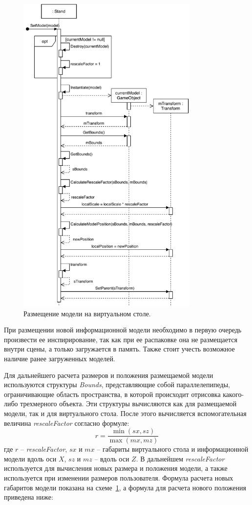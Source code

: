 \begin{figure}[!htp]
    \centering
    \includegraphics[width=0.8\textwidth]{images/UML-SPlaceModel.pdf}
    \caption{Размещение модели на виртуальном столе.}
    \label{figure:SPlaceModel}
\end{figure}

При размещении новой информационной модели необходимо в первую очередь
произвести ее инспирирование, так как при ее распаковке она не размещается
внутри сцены, а только загружается в память.
Также стоит учесть возможное наличие ранее загруженных моделей.

Для дальнейшего расчета размеров и положения размещаемой модели используются
структуры \emph{Bounds}, представляющие собой параллелепипеды,
ограничивающие область пространства, в которой происходит отрисовка
какого-либо трехмерного объекта. Эти структуры вычисляются как для
размещаемой модели, так и для виртуального стола.
После этого вычисляется вспомогательная величина \emph{rescaleFactor}
согласно формуле:
\[
    r = \frac{
        \min ( sx, sz )
    }{
        \max ( mx, mz )
    }
\]
где $r$ -- \emph{rescaleFactor},
$sx$ и $mx$ -- габариты виртуального стола и информационной модели
вдоль оси $X$, $sz$ и $mz$ -- вдоль оси $Z$.
В дальнейшем \emph{rescaleFactor} используется для вычисления новых
размера и положения модели, а также используется при изменении размеров пользователя.
Формула расчета новых габаритов модели показана на схеме~\ref{figure:SPlaceModel},
а формула для расчета нового положения приведена ниже:

